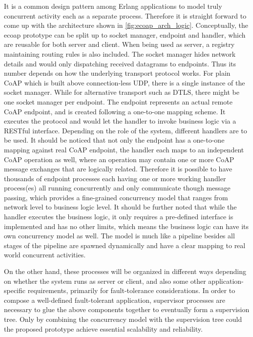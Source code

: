 It is a common design pattern among Erlang applications to model truly concurrent activity each as a separate process. Therefore it is straight forward to come up with the architecture shown in \autoref{fig:ecoap_arch_logic}. Conceptually, the ecoap prototype can be split up to socket manager, endpoint and handler, which are reusable for both server and client. When being used as server, a registry maintaining routing rules is also included. The socket manager hides network details and would only dispatching received datagrams to endpoints. Thus its number depends on how the underlying transport protocol works. For plain CoAP which is built above connection-less UDP, there is a single instance of the socket manager. While for alternative transport such as DTLS, there might be one socket manager per endpoint. The endpoint represents an actual remote CoAP endpoint, and is created following a one-to-one mapping scheme. It executes the protocol and would let the handler to invoke business logic via a RESTful interface. Depending on the role of the system, different handlers are to be used. It should be noticed that not only the endpoint has a one-to-one mapping against real CoAP endpoint, the handler each maps to an independent CoAP operation as well, where an operation may contain one or more CoAP message exchanges that are logically related. Therefore it is possible to have thousands of endpoint processes each having one or more working handler process(es) all running concurrently and only communicate though message passing, which provides a fine-grained concurrency model that ranges from network level to business logic level. It should be further noted that while the handler executes the business logic, it only requires a pre-defined interface is implemented and has no other limits, which means the business logic can have its own concurrency model as well. The model is much like a pipeline besides all stages of the pipeline are spawned dynamically and have a clear mapping to real world concurrent activities. 
 
On the other hand, these processes will be organized in different ways depending on whether the system runs as server or client, and also some other application-specific requirements, primarily for fault-tolerance considerations. In order to compose a well-defined fault-tolerant application, supervisor processes are necessary to glue the above components together to eventually form a supervision tree. Only by combining the concurrency model with the supervision tree could the proposed prototype achieve essential scalability and reliability. 

